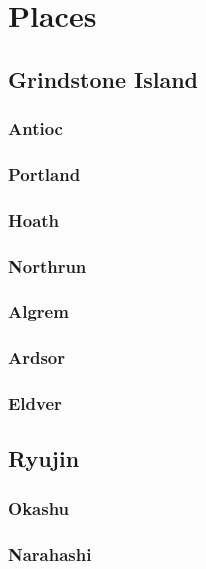 \section{Places}

	\subsection{Grindstone Island}

		\subsubsection{Antioc}

		\subsubsection{Portland}

		\subsubsection{Hoath}
	
		\subsubsection{Northrun}
	
		\subsubsection{Algrem}
		
		\subsubsection{Ardsor}

		\subsubsection{Eldver}

	\subsection{Ryujin}

		\subsubsection{Okashu}

		\subsubsection{Narahashi}

